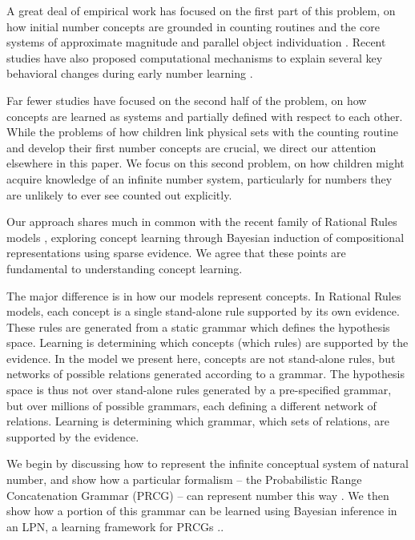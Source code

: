 \documentclass[10pt,letterpaper]{article}
\begin{document}
A great deal of empirical work has focused on the first part of this
problem, on how initial number concepts are grounded in counting
routines and the core systems of approximate magnitude and parallel
object individuation
\citep{Car2009,dehaene2011number,feigenson2004core}. Recent studies
have also proposed computational mechanisms to explain several key
behavioral changes during early number learning
\citep{PianGoodTen2012}.

Far fewer studies have focused on the second half of the problem, on
how concepts are learned as systems and partially defined with respect
to each other. While the problems of how children link physical sets
with the counting routine and develop their first number concepts are
crucial, we direct our attention elsewhere in this paper. We focus on
this second problem, on how children might acquire knowledge of an
infinite number system, particularly for numbers they are unlikely to
ever see counted out explicitly.

Our approach shares much in common with the recent family of Rational
Rules models
\citep{goodman2008rational,T.D.Ullman:2012:1b1b6,PianGoodTen2012},
exploring concept learning through Bayesian induction of compositional
representations using sparse evidence. We agree that these points are
fundamental to understanding concept learning.

The major difference is in how our models represent concepts. In
Rational Rules models, each concept is a single stand-alone rule
supported by its own evidence. These rules are generated from a static
grammar which defines the hypothesis space. Learning is determining
which concepts (which rules) are supported by the evidence. In the
model we present here, concepts are not stand-alone rules, but
networks of possible relations generated according to a grammar. The
hypothesis space is thus not over stand-alone rules generated by a
pre-specified grammar, but over millions of possible grammars, each
defining a different network of relations. Learning is determining
which grammar, which sets of relations, are supported by the evidence.

We begin by discussing how to represent the infinite conceptual system
of natural number, and show how a particular formalism -- the
Probabilistic Range Concatenation Grammar (PRCG) -- can represent
number this way \citep{boullier2005range}. We then show how a portion
of this grammar can be learned using Bayesian inference in an LPN, a
learning framework for PRCGs \citep{DecRulTen2015}..
\end{document}
